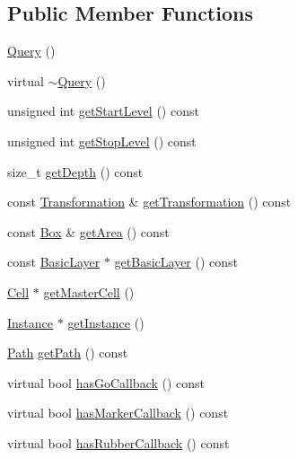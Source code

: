 \subsection*{Public Member Functions}
\begin{DoxyCompactItemize}
\item 
\hyperlink{classHurricane_1_1Query_a999eaaaf34672fb056df14629d3197d1}{Query} ()
\item 
virtual \hyperlink{classHurricane_1_1Query_acd18d98c6bf30dd049916508a397391a}{$\sim$\-Query} ()
\item 
unsigned int \hyperlink{classHurricane_1_1Query_ab266f31053e5cfd1cce38e46f183f83a}{get\-Start\-Level} () const 
\item 
unsigned int \hyperlink{classHurricane_1_1Query_a3c7a6c9fe7a02b2d840b116230761518}{get\-Stop\-Level} () const 
\item 
size\-\_\-t \hyperlink{classHurricane_1_1Query_aa128d6c2fbdcd7c296c10e72cf79dfe2}{get\-Depth} () const 
\item 
const \hyperlink{classHurricane_1_1Transformation}{Transformation} \& \hyperlink{classHurricane_1_1Query_ac47ab5a4d3465ddae338f0c06490309d}{get\-Transformation} () const 
\item 
const \hyperlink{classHurricane_1_1Box}{Box} \& \hyperlink{classHurricane_1_1Query_ad281dddf492cbcd1d334faaba2fbbce7}{get\-Area} () const 
\item 
const \hyperlink{classHurricane_1_1BasicLayer}{Basic\-Layer} $\ast$ \hyperlink{classHurricane_1_1Query_a0e60112974e06f01adac744e9847b408}{get\-Basic\-Layer} () const 
\item 
\hyperlink{classHurricane_1_1Cell}{Cell} $\ast$ \hyperlink{classHurricane_1_1Query_add13f7ff193df6ce5223f9761b6cba69}{get\-Master\-Cell} ()
\item 
\hyperlink{classHurricane_1_1Instance}{Instance} $\ast$ \hyperlink{classHurricane_1_1Query_a459b9f175f77fce91963eeb192c6e018}{get\-Instance} ()
\item 
\hyperlink{classHurricane_1_1Path}{Path} \hyperlink{classHurricane_1_1Query_a930c098d4ab307bd068c62f0beaeafc7}{get\-Path} () const 
\item 
virtual bool \hyperlink{classHurricane_1_1Query_af9d954c6f7f0d08f3b7eac968f91f244}{has\-Go\-Callback} () const 
\item 
virtual bool \hyperlink{classHurricane_1_1Query_ab5a5a52ebda1f61b43d3bf8fcc6501c8}{has\-Marker\-Callback} () const 
\item 
virtual bool \hyperlink{classHurricane_1_1Query_a4be86efdb6a87f94ed657471b9b0adbe}{has\-Rubber\-Callback} () const 

\end{DoxyCompactItemize}
